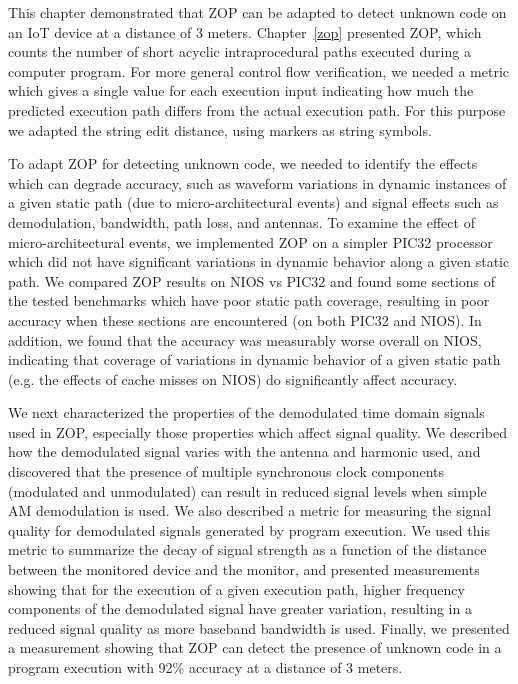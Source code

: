 This chapter demonstrated that ZOP can be adapted to detect unknown code on an IoT device at a distance of 3 meters. Chapter~\ref{zop} presented ZOP, which counts the number of short acyclic intraprocedural paths executed during a computer program. For more general control flow verification, we needed a metric which gives a single value for each execution input indicating how much the predicted execution path differs from the actual execution path. For this purpose we adapted the string edit distance, using markers as string symbols. 

To adapt ZOP for detecting unknown code, we needed to identify the effects which can degrade accuracy, such as waveform variations in dynamic instances of a given static path (due to micro-architectural events) and signal effects such as demodulation, bandwidth, path loss, and antennas. To examine the effect of micro-architectural events, we implemented ZOP on a simpler PIC32 processor which did not have significant variations in dynamic behavior along a given static path. We compared ZOP results on NIOS vs PIC32 and found some sections of the tested benchmarks which have poor static path coverage, resulting in poor accuracy when these sections are encountered (on both PIC32 and NIOS). In addition, we found that the accuracy was measurably worse overall on NIOS, indicating that coverage of variations in dynamic behavior of a given static path (e.g. the effects of cache misses on NIOS) do significantly affect accuracy.

We next characterized the properties of the demodulated time domain signals used in ZOP, especially those properties which affect signal quality. We described how the demodulated signal varies with the antenna and harmonic used, and discovered that the presence of multiple synchronous clock components (modulated and unmodulated) can result in reduced signal levels when simple AM demodulation is used. We also described a metric for measuring the signal quality for demodulated signals generated by program execution. We used this metric to summarize the decay of signal strength as a function of the distance between the monitored device and the monitor, and presented measurements showing that for the execution of a given execution path, higher frequency components of the demodulated signal have greater variation, resulting in a reduced signal quality as more baseband bandwidth is used. Finally, we presented a measurement showing that ZOP can detect the presence of unknown code in a program execution with 92\% accuracy at a distance of 3 meters.



